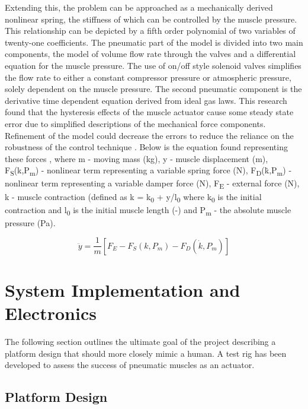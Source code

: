 \documentclass[11pt,a4paper]{article}
\begin{document}
Extending this, the problem can be approached as a mechanically derived nonlinear spring, the stiffness of which can be controlled by the muscle pressure. This relationship can be depicted by a fifth order polynomial of two variables of twenty-one coefficients. The pneumatic part of the model is divided into two main components, the model of volume flow rate through the valves and a differential equation for the muscle pressure. The use of on/off style solenoid valves simplifies the flow rate to either a constant compressor pressure or atmospheric pressure, solely dependent on the muscle pressure. The second pneumatic component is the derivative time dependent equation derived from ideal gas laws. This research found that the hysteresis effects of the muscle actuator cause some steady state error due to simplified descriptions of the mechanical force components. Refinement of the model could decrease the errors to reduce the reliance on the robustness of the control technique \cite{hosovsky_2012}. Below is the equation found representing these forces , where m - moving mass (kg), y - muscle displacement (m), F\textsubscript{S}(k,P\textsubscript{m}) - nonlinear term representing a variable spring force (N), F\textsubscript{D}(\.{k},P\textsubscript{m}) - nonlinear term representing a variable damper force (N), F\textsubscript{E} - external force (N), k - muscle contraction (defined as k = k\textsubscript{0} + y/l\textsubscript{0} where k\textsubscript{0} is the initial contraction and l\textsubscript{0} is the initial muscle length (-) and P\textsubscript{m} - the absolute muscle pressure (Pa).

\begin{equation}
    \ddot{y} = \frac{1}{m}[F_E-F_S(k,P_m)-F_D(\dot{k},P_m)]
    \label{math:dynamicforce}
\end{equation}

\newpage
\section{System Implementation and Electronics}
\label{sec:system_implementation}

The following section outlines the ultimate goal of the project describing a platform design that should more closely mimic a human. A test rig has been developed to assess the success of pneumatic muscles as an actuator.

\subsection{Platform Design}
\label{sub:platform_design}
\end{document}
